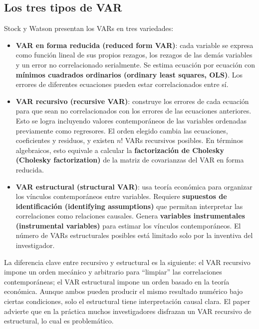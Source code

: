 \documentclass[12pt]{article}
\begin{document}
\subsection{Los tres tipos de VAR}

Stock y Watson presentan los VARs en tres variedades:

\begin{itemize}
  \item \textbf{VAR en forma reducida (reduced form VAR)}: cada variable se expresa como funci\'on lineal de sus propios rezagos, los rezagos de las dem\'as variables y un error no correlacionado serialmente. Se estima ecuaci\'on por ecuaci\'on con \textbf{m\'inimos cuadrados ordinarios (ordinary least squares, OLS)}. Los errores de diferentes ecuaciones pueden estar correlacionados entre s\'i.

  \item \textbf{VAR recursivo (recursive VAR)}: construye los errores de cada ecuaci\'on para que sean no correlacionados con los errores de las ecuaciones anteriores. Esto se logra incluyendo valores contempor\'aneos de las variables ordenadas previamente como regresores. El orden elegido cambia las ecuaciones, coeficientes y residuos, y existen $n!$ VARs recursivos posibles. En t\'erminos algebraicos, esto equivale a calcular la \textbf{factorizaci\'on de Cholesky (Cholesky factorization)} de la matriz de covarianzas del VAR en forma reducida.

  \item \textbf{VAR estructural (structural VAR)}: usa teor\'ia econ\'omica para organizar los v\'inculos contempor\'aneos entre variables. Requiere \textbf{supuestos de identificaci\'on (identifying assumptions)} que permitan interpretar las correlaciones como relaciones causales. Genera \textbf{variables instrumentales (instrumental variables)} para estimar los v\'inculos contempor\'aneos. El n\'umero de VARs estructurales posibles est\'a limitado solo por la inventiva del investigador.
\end{itemize}

\begin{intuicion}
La diferencia clave entre recursivo y estructural es la siguiente: el VAR recursivo impone un orden mec\'anico y arbitrario para ``limpiar'' las correlaciones contempor\'aneas; el VAR estructural impone un orden basado en la teor\'ia econ\'omica. Aunque ambos pueden producir el mismo resultado num\'erico bajo ciertas condiciones, solo el estructural tiene interpretaci\'on causal clara. El paper advierte que en la pr\'actica muchos investigadores disfrazan un VAR recursivo de estructural, lo cual es problem\'atico.
\end{intuicion}
\end{document}
